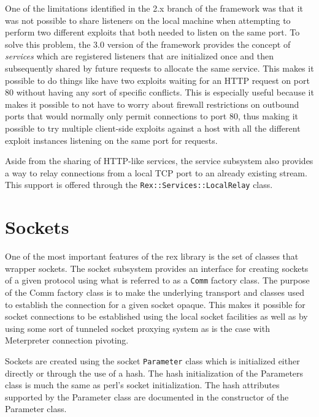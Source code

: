 \documentclass{report}
\begin{document}
\par
One of the limitations identified in the 2.x branch of the framework
was that it was not possible to share listeners on the local machine
when attempting to perform two different exploits that both needed
to listen on the same port.  To solve this problem, the 3.0 version
of the framework provides the concept of \textit{services} which are
registered listeners that are initialized once and then subsequently
shared by future requests to allocate the same service.  This makes
it possible to do things like have two exploits waiting for an HTTP
request on port 80 without having any sort of specific conflicts.
This is especially useful because it makes it possible to not have
to worry about firewall restrictions on outbound ports that would
normally only permit connections to port 80, thus making it possible
to try multiple client-side exploits against a host with all the
different exploit instances listening on the same port for requests.

\par
Aside from the sharing of HTTP-like services, the service subsystem
also provides a way to relay connections from a local TCP port to an
already existing stream.  This support is offered through the
\texttt{Rex::Services::LocalRelay} class.

    \section{Sockets}

\par
One of the most important features of the rex library is the set of
classes that wrapper sockets.  The socket subsystem provides an
interface for creating sockets of a given protocol using what is
referred to as a \texttt{Comm} factory class.  The purpose of the
Comm factory class is to make the underlying transport and classes
used to establish the connection for a given socket opaque.  This
makes it possible for socket connections to be established using the
local socket facilities as well as by using some sort of tunneled
socket proxying system as is the case with Meterpreter connection
pivoting.

\par
Sockets are created using the socket \texttt{Parameter} class which
is initialized either directly or through the use of a hash.  The
hash initialization of the Parameters class is much the same as
perl's socket initialization.  The hash attributes supported by the
Parameter class are documented in the constructor of the Parameter
class.
\end{document}
